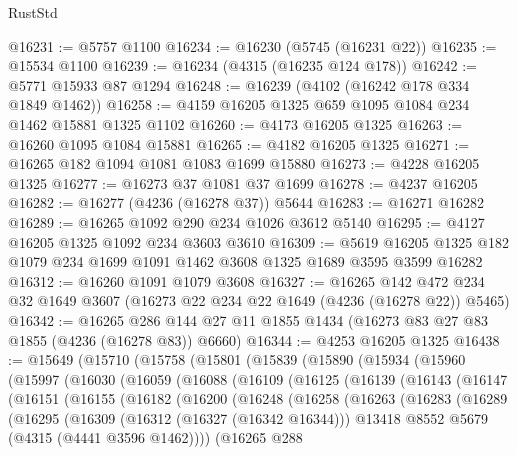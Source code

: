 \begin{lexlean}{RustStd}
\begin{coremodule}
@16231 := @5757 @1100
@16234 := @16230 (@5745 (@16231 @22))
@16235 := @15534 @1100
@16239 := @16234 (@4315 (@16235 @124 @178))
@16242 := @5771 @15933 @87 @1294
@16248 := @16239 (@4102 (@16242 @178 @334 @1849 @1462))
@16258 := @4159 @16205 @1325 @659 @1095 @1084 @234 @1462 @15881 @1325 @1102
@16260 := @4173 @16205 @1325
@16263 := @16260 @1095 @1084 @15881
@16265 := @4182 @16205 @1325
@16271 := @16265 @182 @1094 @1081 @1083 @1699 @15880
@16273 := @4228 @16205 @1325
@16277 := @16273 @37 @1081 @37 @1699
@16278 := @4237 @16205
@16282 := @16277 (@4236 (@16278 @37)) @5644
@16283 := @16271 @16282
@16289 := @16265 @1092 @290 @234 @1026 @3612 @5140
@16295 := @4127 @16205 @1325 @1092 @234 @3603 @3610
@16309 := @5619 @16205 @1325 @182 @1079 @234 @1699 @1091 @1462 @3608 @1325 @1689 @3595 @3599 @16282
@16312 := @16260 @1091 @1079 @3608
@16327 := @16265
    @142
    @472
    @234
    @32
    @1649
    @3607
    (@16273 @22 @234 @22 @1649 (@4236 (@16278 @22)) @5465)
@16342 := @16265 @286 @144 @27 @11 @1855 @1434 (@16273 @83 @27 @83 @1855 (@4236 (@16278 @83)) @6660)
@16344 := @4253 @16205 @1325
@16438 := @15649
    (@15710
      (@15758
        (@15801
          (@15839
            (@15890
              (@15934
                (@15960
                  (@15997
                    (@16030
                      (@16059
                        (@16088
                          (@16109
                            (@16125
                              (@16139
                                (@16143
                                  (@16147
                                    (@16151
                                      (@16155
                                        (@16182
                                          (@16200
                                            (@16248
                                              (@16258
                                                (@16263
                                                  (@16283
                                                    (@16289
                                                      (@16295
                                                        (@16309
                                                          (@16312 (@16327 (@16342 @16344)))
                                                          @13418
                                                          @8552
                                                          @5679
                                                          (@4315 (@4441 @3596 @1462))))
                                                      (@16265
                                                        @288

\end{coremodule}
\end{lexlean}
